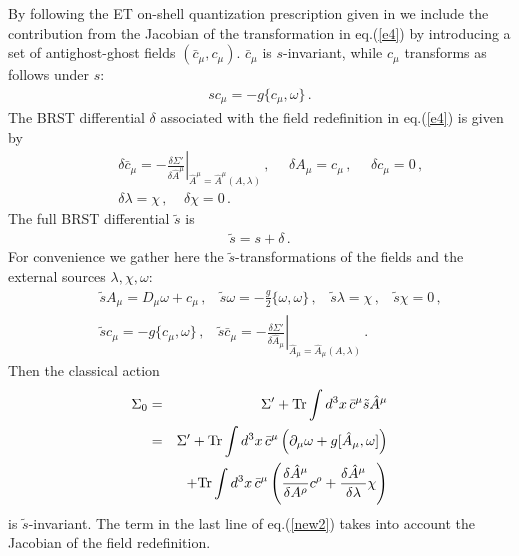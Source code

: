 \documentclass[a4paper,11pt]{article}
\begin{document}
By following the ET on-shell quantization
prescription given in \cite{ET}
we include the contribution from the Jacobian of the transformation in eq.(\ref{e4})
by introducing a set of antighost-ghost fields $(\bar c_\mu, c_\mu)$.
$\bar c_\mu$ is $s$-invariant, while 
$c_\mu$ transforms as follows under $s$:
%
\begin{eqnarray}
s c_\mu = -g \{ c_\mu, \omega \} \, .
\label{m1}
\end{eqnarray}
%
The BRST differential $\delta$ associated with the field redefinition in eq.(\ref{e4}) is given by
%
\begin{eqnarray}
&& \delta \bar c_\mu = -\left . \frac{\delta \Sigma'}{\delta \hat A^\mu} \right |_{\hat A^\mu=\hat A^\mu(A,\lambda)} \,, 
~~~~~~ \delta A_\mu = c_\mu \, , ~~~~~~ \delta c_\mu = 0 \, ,  \nonumber \\  
&& \delta \lambda = \chi \, ,  ~~~~~ \delta \chi = 0 \, .
\label{new1_bis}
\end{eqnarray}
%
The full BRST differential $\tilde s$ is
%
\begin{eqnarray}
\tilde s = s + \delta \, .
\label{new2_bis}
\end{eqnarray}
%
For convenience we gather here the $\tilde s$-transformations
of the fields and the external sources 
$\lambda,\chi,\omega$:
%
\begin{eqnarray}
&& \tilde s A_\mu = D_\mu \omega + c_\mu \, , ~~~~
\tilde s \omega = -\frac{g}{2} \{ \omega,\omega \} \, , ~~~~
\tilde s \lambda = \chi \, , ~~~~ \tilde s \chi =0 \, ,
\nonumber \\
&& \tilde s c_\mu = -g \{ c_\mu, \omega \} \, , ~~~~ 
\tilde s \bar c_\mu = - \left . \frac{\delta \Sigma'}{\delta \hat A_\mu}
\right |_{\hat A_\mu = \hat A_\mu(A,\lambda)} \, .
\label{new2_ter}
\end{eqnarray}
%
Then the classical action
%
\begin{eqnarray}
\Sigma_0 & = & \Sigma' + {\rm Tr} \int d^3x \, \bar c^\mu \tilde s \hat A^\mu \nonumber \\
& = &  \Sigma' + {\rm Tr} \int d^3x \, \bar c^\mu \left ( \partial_\mu \omega + g[\hat A_\mu, \omega] \right) \nonumber \\
&   & + {\rm Tr} \int d^3x \, \bar c^\mu \left ( \frac{\delta \hat A^\mu}{\delta A ^\rho} c^\rho 
                                                          +\frac{\delta \hat A^\mu}{\delta \lambda} \chi \right ) 
\label{new2}
\end{eqnarray}
%
is $\tilde s$-invariant. 
The term in the last line of eq.(\ref{new2}) takes into account the Jacobian of the field redefinition.
\end{document}
